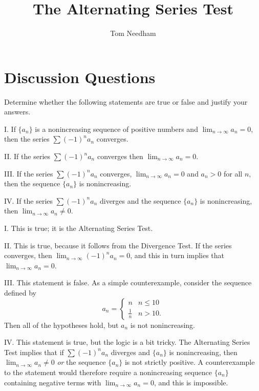 \documentclass[noauthor]{ximera}
\author{Tom Needham}
\title[Collaborate:]{The Alternating Series Test}
\begin{document}
\begin{abstract}
\end{abstract}
\maketitle

\vspace{-.4in}

\section{Discussion Questions}

\begin{problem}
Determine whether the following statements are true or false and justify your answers.

I. If $\{a_n\}$ is a nonincreasing sequence of positive numbers and $\lim_{n\rightarrow \infty} a_n = 0$, then the series $\sum (-1)^n a_n$ converges.

II. If the series $\sum (-1)^n a_n$ converges then $\lim_{n \rightarrow \infty} a_n = 0$.

III. If the series $\sum (-1)^n a_n$ converges, $\lim_{n\rightarrow \infty} a_n = 0$ and $a_n > 0$ for all $n$, then the sequence $\{a_n\}$ is nonincreasing.

IV. If the series $\sum (-1)^n a_n$ diverges and the sequence $\{a_n\}$ is nonincreasing, then $\lim_{n \rightarrow \infty} a_n \neq 0$.

\begin{freeResponse}
I. This is true; it is the Alternating Series Test.

II. This is true, because it follows from the Divergence Test. If the series converges, then $\lim_{n\rightarrow \infty} (-1)^n a_n = 0$, and this in turn implies that $\lim_{n\rightarrow \infty} a_n = 0$.

III. This statement is false. As a simple counterexample, consider the sequence defined by
$$
a_n = \left\{\begin{array}{cc}
n & n \leq 10 \\
\frac{1}{n} & n > 10. \end{array}\right.
$$
Then all of the hypotheses hold, but $a_n$ is not nonincreasing.

IV. This statement is true, but the logic is a bit tricky. The Alternating Series Test implies that if $\sum (-1)^n a_n$ diverges and $\{a_n\}$ is nonincreasing, then $\lim_{n \rightarrow \infty} a_n \neq 0$ \emph{or} the sequence $\{a_n\}$ is not strictly positive. A counterexample to the statement would therefore require a nonincreasing sequence $\{a_n\}$ containing negative terms with $\lim_{n\rightarrow \infty} a_n = 0$, and this is impossible.
\end{freeResponse}
\end{problem}
\end{document}
